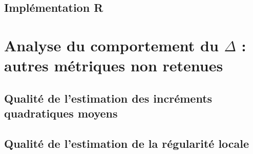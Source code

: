 \pagebreak

\section{Implémentation R}
\label{annexe:code-R}




\chapter{
  Analyse du comportement du $\Delta$ : autres métriques non retenues
 }

\section{Qualité de l'estimation des incréments quadratiques moyens}


\section{Qualité de l'estimation de la régularité locale}

